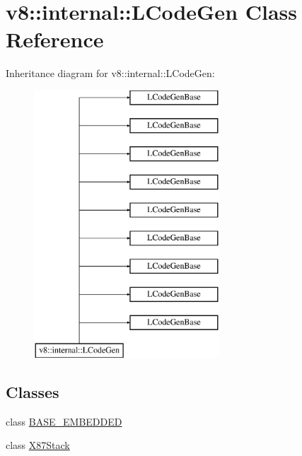 \hypertarget{classv8_1_1internal_1_1_l_code_gen}{}\section{v8\+:\+:internal\+:\+:L\+Code\+Gen Class Reference}
\label{classv8_1_1internal_1_1_l_code_gen}
Inheritance diagram for v8\+:\+:internal\+:\+:L\+Code\+Gen\+:\begin{figure}[H]
\begin{center}
\leavevmode
\includegraphics[height=10.000000cm]{classv8_1_1internal_1_1_l_code_gen}
\end{center}
\end{figure}
\subsection*{Classes}
\begin{DoxyCompactItemize}
\item 
class \hyperlink{classv8_1_1internal_1_1_l_code_gen_1_1_b_a_s_e___e_m_b_e_d_d_e_d}{B\+A\+S\+E\+\_\+\+E\+M\+B\+E\+D\+D\+ED}
\item 
class \hyperlink{classv8_1_1internal_1_1_l_code_gen_1_1_x87_stack}{X87\+Stack}
\end{DoxyCompactItemize}
